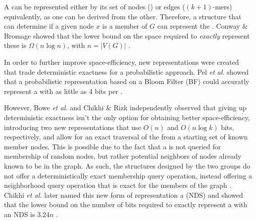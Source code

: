 A \dBG can be represented either by its set of nodes () or edges ($(k+1)$-mers) equivalently, as one can be derived from the other. Therefore, a structure that can determine if a given node $x$ is a member of $G$ can represent the \dBG. Conway \& Bromage showed that the lower bound on the space required to \emph{exactly} represent these  is $\Omega(n \log n)$, with $n=|V(G)|$ \cite{Conway2011}.

In order to further improve space-efficiency, new representations were created that trade deterministic exactness for a probabilistic approach. Pel \emph{et al.} showed that a probabilistic representation based on a Bloom Filter (BF) could accuratly represent a \dBG with as little as 4 bits per \kmer \cite{Pell2012}. 

However, Bowe \emph{et al.} \cite{Bowe2012} and Chikhi \& Rizk \cite{Chikhi2013} independently observed that giving up deterministic exactness isn't the only option for obtaining better space-efficiency, introducing two new representations that use $O(n)$ and $O(n \log k)$ bits, respectively, and allow for an exact traversal of the \dBG from a starting set of known member nodes. This is possible due to the fact that a \dBG is not queried for membership of random nodes, but rather potential neighbors of nodes already known to be in the graph. As such, the structures designed by the two groups do not offer a deterministically exact membership query operation, instead offering a neighborhood query operation that is exact for the members of the graph \cite{Bowe2012} \cite{Chikhi2013}. Chikhi \emph{et al.} later named this new form of representation a  (NDS) and showed that the lower bound on the number of bits required to exactly represent a \dBG with an NDS is $3.24n$ \cite{Chikhi2014}.


